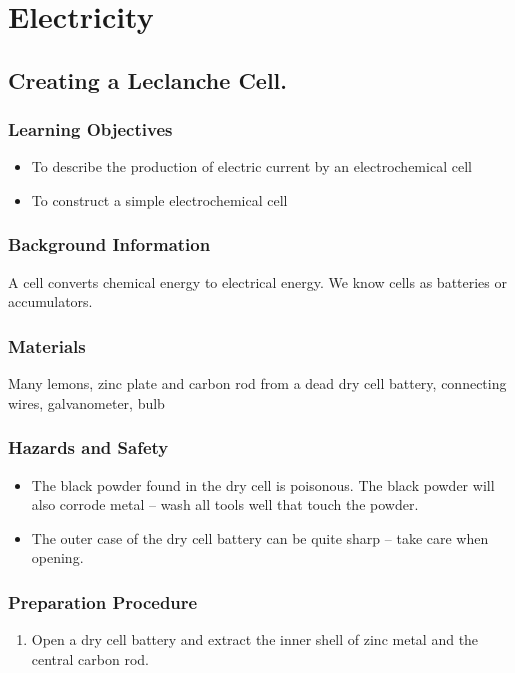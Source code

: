 \section{Electricity}

\subsection{Creating a Leclanche Cell.}

\subsubsection*{Learning Objectives}
\begin{itemize}
\item{To describe the production of electric current by an electrochemical cell}
\item{To construct a simple electrochemical cell}
\end{itemize}

\subsubsection*{Background Information}
A cell converts chemical energy to electrical energy.  We know cells as batteries or accumulators.

\subsubsection*{Materials}
Many lemons, zinc plate and carbon rod from a dead dry cell battery, connecting wires, galvanometer, bulb

\subsubsection*{Hazards and Safety}
\begin{itemize}
\item{The black powder found in the dry cell is poisonous. The black powder will also corrode metal -- wash all tools well that touch the powder.}
\item{The outer case of the dry cell battery can be quite sharp -- take care when opening.}
\end{itemize}

\subsubsection*{Preparation Procedure}
\begin{enumerate}
\item{Open a dry cell battery and extract the inner shell of zinc metal and the central carbon rod.}
\end{enumerate}

